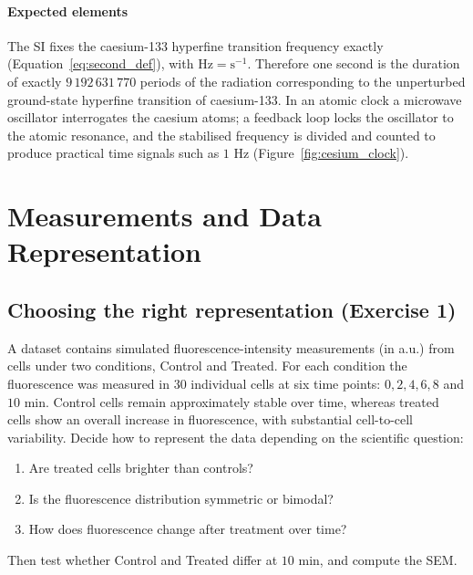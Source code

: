 \paragraph{Expected elements} The SI fixes the caesium-133 hyperfine transition frequency exactly (Equation~\eqref{eq:second_def}), with $\text{Hz} = \text{s}^{-1}$. Therefore one second is the duration of exactly $9\,192\,631\,770$ periods of the radiation corresponding to the unperturbed ground-state hyperfine transition of caesium-133. In an atomic clock a microwave oscillator interrogates the caesium atoms; a feedback loop locks the oscillator to the atomic resonance, and the stabilised frequency is divided and counted to produce practical time signals such as $1\text{ Hz}$ (Figure~\ref{fig:cesium_clock}).

\section{Measurements and Data Representation}
\label{app:ex_ch2}

\subsection{Choosing the right representation (Exercise 1)}
\label{ex:data_representation}

A dataset contains simulated fluorescence-intensity measurements (in a.u.) from cells under two conditions, Control and Treated. For each condition the fluorescence was measured in 30 individual cells at six time points: $0, 2, 4, 6, 8$ and $10\text{ min}$. Control cells remain approximately stable over time, whereas treated cells show an overall increase in fluorescence, with substantial cell-to-cell variability. Decide how to represent the data depending on the scientific question:
\begin{enumerate}[label=(\arabic*)]
    \item Are treated cells brighter than controls?
    \item Is the fluorescence distribution symmetric or bimodal?
    \item How does fluorescence change after treatment over time?
\end{enumerate}
Then test whether Control and Treated differ at $10\text{ min}$, and compute the SEM.

